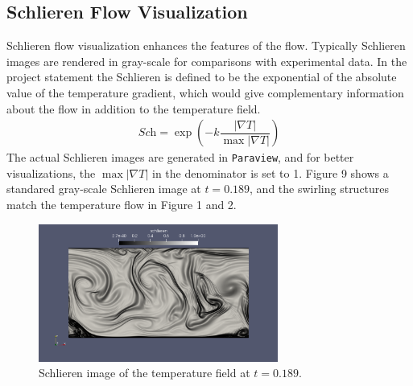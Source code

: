 \documentclass[11pt]{article} %
\begin{document}
\subsection{Schlieren Flow Visualization}
Schlieren flow visualization enhances the features of the flow. Typically Schlieren images are rendered in gray-scale for comparisons with experimental data. In the project statement the Schlieren is defined to be the exponential of the absolute value of the temperature gradient, which would give complementary information about the flow in addition to the temperature field.
\begin{gather}
    \textit{Sch} = \exp \left( -k \dfrac{|\nabla T|}{\max{|\nabla T|}} \right)
\end{gather}
The actual Schlieren images are generated in \texttt{Paraview}, and for better visualizations, the $\max{|\nabla T|}$ in the denominator is set to 1. Figure 9 shows a standared gray-scale Schlieren image at $t=0.189$, and the swirling structures match the temperature flow in Figure 1 and 2.
\begin{figure}[h!]
\centering
\includegraphics[width=0.7\textwidth]{schlieren_grey.png}
\caption{Schlieren image of the temperature field at $t=0.189$.}
\end{figure}
\end{document}
